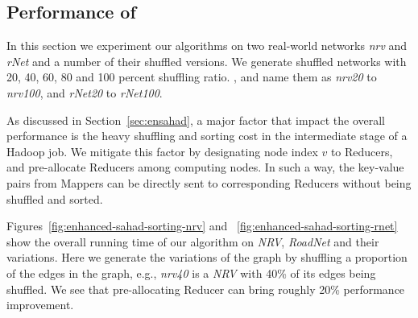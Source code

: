 \subsection{Performance of \ensahad{}}
\label{sec:exp:enhanced-sahad}


In this section we experiment our algorithms on two real-world networks
\textit{nrv} and \textit{rNet} and a number of their shuffled versions. We
generate shuffled networks with 20, 40, 60, 80 and 100 percent shuffling ratio.
, and name them as \textit{nrv20} to \textit{nrv100}, and \textit{rNet20} to
\textit{rNet100}. 


As discussed in Section~\ref{sec:ensahad}, a major factor that impact the
overall performance is the heavy shuffling and sorting cost in the intermediate
stage of a Hadoop job. We mitigate this factor by designating node index $v$ to
Reducers, and pre-allocate Reducers among computing nodes. In such a way, the
key-value pairs from Mappers can be directly sent to corresponding Reducers
without being shuffled and sorted.  

Figures~\ref{fig:enhanced-sahad-sorting-nrv} and
~\ref{fig:enhanced-sahad-sorting-rnet} show the overall running time of our
algorithm on \textit{NRV}, \textit{RoadNet} and their variations. Here we
generate the variations of the graph by shuffling a proportion of the edges in
the graph, e.g., \textit{nrv40} is a \textit{NRV} with 40\% of its edges being
shuffled. We see that pre-allocating Reducer can bring roughly 20\% performance
improvement.  

